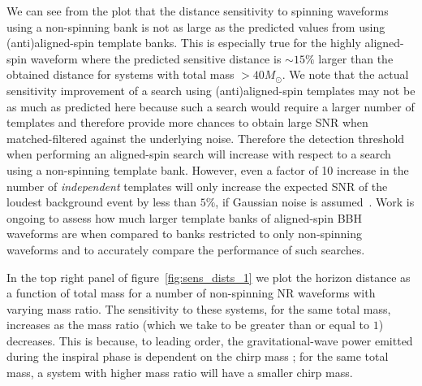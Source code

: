 We can see from the plot 
that the distance sensitivity to spinning waveforms using a non-spinning bank 
is not as large as the predicted values from using (anti)aligned-spin template 
banks. 
This is especially true for the highly aligned-spin waveform where the 
predicted 
sensitive distance is $\sim 15\%$ larger than the obtained distance for systems 
with total mass $> 40M_{\odot}$. We note that the actual sensitivity 
improvement of a search using (anti)aligned-spin templates may not be as much 
as predicted here because such a search would require a larger number of 
templates and therefore provide more chances to obtain large SNR when 
matched-filtered against the underlying noise. Therefore the detection 
threshold 
when performing an aligned-spin search will increase with respect to a 
search using a non-spinning template bank. However, even a factor of 10 
increase in the number of \emph{independent} templates will only increase the 
expected SNR of the loudest background event by less than $5\%$, if 
Gaussian noise is assumed~\cite{Harry:2013tca}. Work is ongoing to assess how 
much larger template banks of aligned-spin BBH waveforms are when compared to 
banks restricted to only non-spinning waveforms and to accurately compare the 
performance of such searches.

In the top right panel of figure~\ref{fig:sens_dists_1} we plot the horizon 
distance as a function of total mass for a number of non-spinning NR waveforms 
with varying mass ratio. The sensitivity to these systems, for the same total 
mass, increases as the mass ratio (which we take to be greater than or equal to
$1$) decreases. This is because, to leading order, 
the gravitational-wave power emitted during the inspiral phase is dependent on 
the chirp mass \cite{Peters:1963ux}; for the same total mass, a system with 
higher mass ratio will have a smaller chirp mass.

